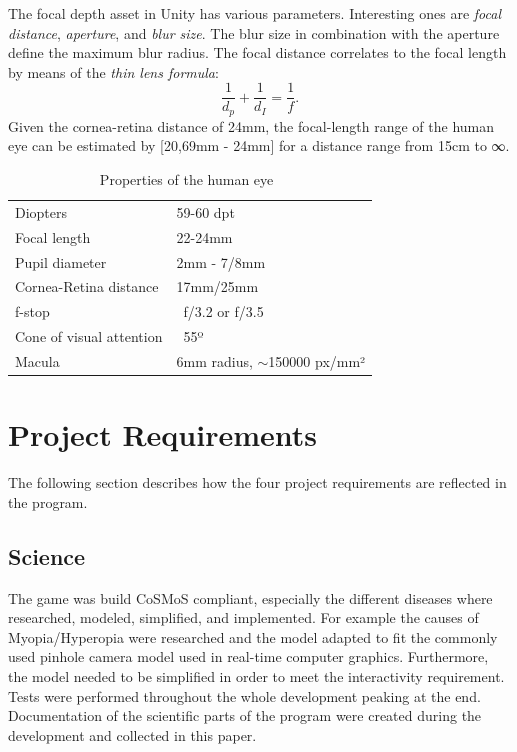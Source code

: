 \documentclass{sig-alternate-05-2015}
\begin{document}
The focal depth asset in Unity has various parameters. Interesting ones are \emph{focal distance}, \emph{aperture}, and \emph{blur size}.
The blur size in combination with the aperture define the maximum blur radius.
The focal distance correlates to the focal length by means of the \emph{thin lens formula}:
\begin{equation}
    \frac{1}{d_p} + \frac{1}{d_I} = \frac{1}{f}.
\end{equation}
Given the cornea-retina distance of 24mm, the focal-length range of the human eye can be estimated by [20,69mm - 24mm] for a distance range from 15cm to ∞.
%
\begin{table}
    \centering
    \begin{tabular}{ll}
        Diopters                & 59-60 dpt \\
        Focal length            & 22-24mm \\
        Pupil diameter          & 2mm - 7/8mm \\
        Cornea-Retina distance  & 17mm/25mm \\
        f-stop                  & ~f/3.2 or f/3.5 \\
        Cone of visual attention& ~55º \\
        Macula                  & 6mm radius, $\sim$150000 px/mm²\\
    \end{tabular}
    \caption{Properties of the human eye~\cite{eye-focal, eyeascamera}}
    \label{tab:eyeproperties}
\end{table}


\section{Project Requirements}

The following section describes how the four project requirements are reflected in the program.

\subsection{Science}

The game was build CoSMoS compliant, especially the different diseases where researched, modeled, simplified, and implemented.
For example the causes of Myopia/Hyperopia were researched and the model adapted to fit the commonly used pinhole camera model used in real-time computer graphics.
Furthermore, the model needed to be simplified in order to meet the interactivity requirement.
Tests were performed throughout the whole development peaking at the end.
Documentation of the scientific parts of the program were created during the development and collected in this paper. 
\end{document}
